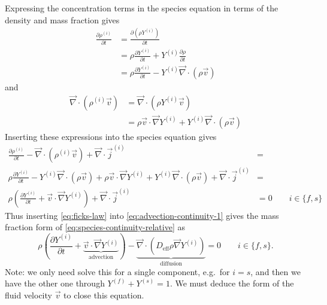 \documentclass[12pt,twoside]{report}
\begin{document}
Expressing the concentration terms in the species equation in terms of the density and mass fraction gives
\begin{align*}
  \frac{\partial \rho^{(i)}}{\partial t} &=
  \frac{\partial (\rho Y^{(i)})}{\partial t} \\
  &=
  \rho \frac{\partial Y^{(i)}}{\partial t} +
  Y^{(i)} \frac{\partial \rho}{\partial t} \\
  &=
  \rho \frac{\partial Y^{(i)}}{\partial t} -
  Y^{(i)} \vec{\nabla} \cdot (\rho \vec{v})
\end{align*}
and
\begin{equation*}
  \begin{aligned}
    \vec{\nabla} \cdot (\rho^{(i)} \vec{v}) &=
    \vec{\nabla} \cdot (\rho Y^{(i)} \vec{v}) \\
    &=
    \rho \vec{v} \cdot \vec{\nabla} Y^{(i)} +
    Y^{(i)} \vec{\nabla} \cdot (\rho \vec{v})
  \end{aligned}
\end{equation*}
Inserting these expressions into the species equation gives
\begin{equation}\label{eq:advection-continuity-1}
  \begin{aligned}
    \frac{\partial \rho^{(i)}}{\partial t} -
    \vec{\nabla} \cdot (\rho^{(i)} \vec{v}) +
    \vec{\nabla} \cdot \vec{j}^{(i)} &= \\
    \rho \frac{\partial Y^{(i)}}{\partial t} -
    Y^{(i)} \vec{\nabla} \cdot (\rho \vec{v}) +
    \rho \vec{v} \cdot \vec{\nabla} Y^{(i)} +
    Y^{(i)} \vec{\nabla} \cdot (\rho \vec{v}) +
    \vec{\nabla} \cdot \vec{j}^{(i)} &= \\
    \rho \left(
    \frac{\partial Y^{(i)}}{\partial t} +
    \vec{v} \cdot \vec{\nabla} Y^{(i)}
    \right) +
    \vec{\nabla} \cdot \vec{j}^{(i)}
    &= 0 \qquad i \in \{f,s\}
  \end{aligned}
\end{equation}
Thus inserting \eqref{eq:ficks-law} into \eqref{eq:advection-continuity-1} gives the mass fraction form of \eqref{eq:species-continuity-relative} as
\begin{equation}\label{eq:mass-fraction-continuity}
  \rho \left(
  \frac{\partial Y^{(i)}}{\partial t} +
  \underbrace{\vec{v} \cdot \vec{\nabla} Y^{(i)}}_\textrm{advection}
  \right)
  -
  \underbrace{\vec{\nabla} \cdot (D_{\textrm{eff}} \rho \vec{\nabla} Y^{(i)})}_\textrm{diffusion}
  = 0
  \qquad i \in \{f,s\}.
\end{equation}
Note: we only need solve this for a single component, e.g.\ for $i=s$, and then we have the other one through $Y^{(f)} + Y^{(s)} = 1$.
We must deduce the form of the fluid velocity $\vec{v}$ to close this equation.
\end{document}
